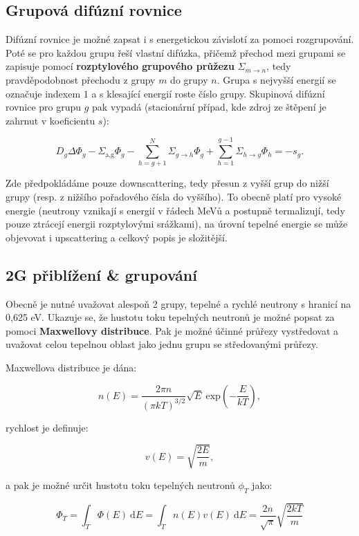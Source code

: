 \subsection{Grupová difúzní rovnice}

Difúzní rovnice je možné zapsat i s energetickou závislotí za pomoci rozgrupování. Poté se pro každou grupu řeší vlastní difúzka, přičemž přechod mezi grupami se zapisuje pomocí \textbf{rozptylového grupového průžezu} $\Sigma_{m \to n}$, tedy pravděpodobnost přechodu z grupy $m$ do grupy $n$. Grupa s nejvyšší energií se označuje indexem $1$ a s klesající energií roste číslo grupy. Skupinová difúzní rovnice pro grupu $g$ pak vypadá (stacionární případ, kde zdroj ze štěpení je zahrnut v koeficientu $s$):

\begin{equation}
    \boxed{
        D_g \Delta \Phi_g - \Sigma_\text{a,g} \Phi_g - \sum^N_{h=g+1} \Sigma_{g \to h} \Phi_g + \sum^{g-1}_{h=1} \Sigma_{h \to g} \Phi_h = -s_g.
    }
\end{equation}

Zde předpokládáme pouze downscattering, tedy přesun z vyšší grup do nižší grupy (resp. z nižšího pořadového čísla do vyššího). To obecně platí pro vysoké energie (neutrony vznikají s energií v řádech MeVů a postupně termalizují, tedy pouze ztrácejí energii rozptylovými srážkami), na úrovní tepelné energie se může objevovat i upscattering a celkový popis je složitější.

\subsection{2G přiblížení \& grupování}

Obecně je nutné uvažovat alespoň 2 grupy, tepelné a rychlé neutrony s hranicí na 0,625 eV. Ukazuje se, že hustotu toku tepelných neutronů je možné popsat za pomoci \textbf{Maxwellovy distribuce}. Pak je možné účinné průřezy vystředovat a uvažovat celou tepelnou oblast jako jednu grupu se středovanými průřezy. 

Maxwellova distribuce je dána:

$$ n(E) = \dfrac{2 \pi n}{(\pi k T)^{3/2}} \sqrt{E} \: \text{exp} \left(- \dfrac{E}{kT}\right), $$

rychlost je definuje:

$$ v(E) = \sqrt{\dfrac{2E}{m}}, $$

a pak je možné určit hustotu toku tepelných neutronů $\phi_T$ jako:

$$ \Phi_T = \int_T \Phi(E) \: \text{d}E = \int_T n(E) v(E) \: \text{d}E = \dfrac{2n}{\sqrt{\pi}} \sqrt{\dfrac{2kT}{m}} $$

